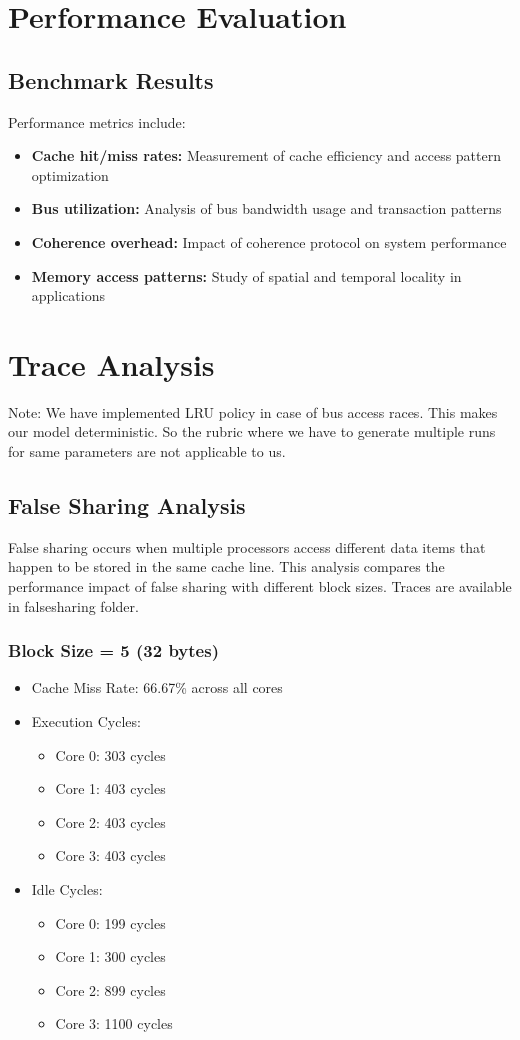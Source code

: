 \documentclass[10pt]{article}
\begin{document}
\section{Performance Evaluation}
\subsection{Benchmark Results}
Performance metrics include:
\begin{itemize}
    \item \textbf{Cache hit/miss rates:} Measurement of cache efficiency and access pattern optimization
    \item \textbf{Bus utilization:} Analysis of bus bandwidth usage and transaction patterns
    \item \textbf{Coherence overhead:} Impact of coherence protocol on system performance
    \item \textbf{Memory access patterns:} Study of spatial and temporal locality in applications
\end{itemize}

\section{Trace Analysis}
Note: We have implemented LRU policy in case of bus access races. This makes our model deterministic. So the rubric where we have to generate multiple runs for same parameters are not applicable to us.
\subsection{False Sharing Analysis}
False sharing occurs when multiple processors access different data items that happen to be stored in the same cache line. This analysis compares the performance impact of false sharing with different block sizes. Traces are available in falsesharing folder.

\subsubsection{Block Size = 5 (32 bytes)}
\begin{itemize}
    \item Cache Miss Rate: 66.67\% across all cores
    \item Execution Cycles:
    \begin{itemize}
        \item Core 0: 303 cycles
        \item Core 1: 403 cycles
        \item Core 2: 403 cycles
        \item Core 3: 403 cycles
    \end{itemize}
    \item Idle Cycles:
    \begin{itemize}
        \item Core 0: 199 cycles
        \item Core 1: 300 cycles
        \item Core 2: 899 cycles
        \item Core 3: 1100 cycles
    \end{itemize}
\end{itemize}
\end{document}
